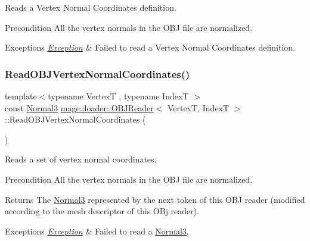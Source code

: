 Reads a Vertex Normal Coordinates definition.

\begin{DoxyPrecond}{Precondition}
All the vertex normals in the O\+BJ file are normalized. 
\end{DoxyPrecond}

\begin{DoxyExceptions}{Exceptions}
{\em \hyperlink{classmage_1_1_exception}{Exception}} & Failed to read a Vertex Normal Coordinates definition. \\
\hline
\end{DoxyExceptions}
\hypertarget{classmage_1_1loader_1_1_o_b_j_reader_abda4acd21665bf5284c8073a73886672}{}\label{classmage_1_1loader_1_1_o_b_j_reader_abda4acd21665bf5284c8073a73886672} 
\subsubsection{\texorpdfstring{Read\+O\+B\+J\+Vertex\+Normal\+Coordinates()}{ReadOBJVertexNormalCoordinates()}}
{\footnotesize\ttfamily template$<$typename VertexT , typename IndexT $>$ \\
const \hyperlink{structmage_1_1_normal3}{Normal3} \hyperlink{classmage_1_1loader_1_1_o_b_j_reader}{mage\+::loader\+::\+O\+B\+J\+Reader}$<$ VertexT, IndexT $>$\+::Read\+O\+B\+J\+Vertex\+Normal\+Coordinates (\begin{DoxyParamCaption}{ }\end{DoxyParamCaption})\hspace{0.3cm}{\ttfamily [private]}}

Reads a set of vertex normal coordinates.

\begin{DoxyPrecond}{Precondition}
All the vertex normals in the O\+BJ file are normalized. 
\end{DoxyPrecond}
\begin{DoxyReturn}{Returns}
The {\ttfamily \hyperlink{structmage_1_1_normal3}{Normal3}} represented by the next token of this O\+BJ reader (modified according to the mesh descriptor of this O\+Bj reader). 
\end{DoxyReturn}

\begin{DoxyExceptions}{Exceptions}
{\em \hyperlink{classmage_1_1_exception}{Exception}} & Failed to read a {\ttfamily \hyperlink{structmage_1_1_normal3}{Normal3}}. \\
\hline
\end{DoxyExceptions}
\hypertarget{classmage_1_1loader_1_1_o_b_j_reader_a52d24ac07533b470b91ff0a2ca8875df}{}\label{classmage_1_1loader_1_1_o_b_j_reader_a52d24ac07533b470b91ff0a2ca8875df} 
